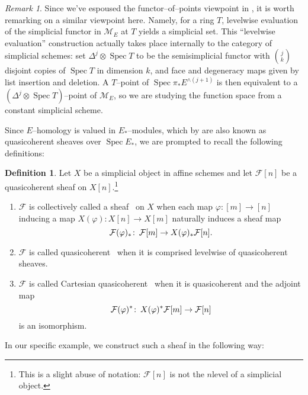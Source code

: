 \documentclass{amsart}
\newcommand{\<}{\langle}
\renewcommand{\>}{\rangle}
\newcommand{\sm}{\wedge}
\renewcommand{\phi}{\varphi}
\newcommand{\co}{\colon\thinspace}
\newcommand{\sheaf}[1]{\mathcal{#1}}
\DeclareMathOperator{\Spec}{Spec}
\theoremstyle{plain}
\theoremstyle{definition}
\newtheorem*{definition}{Definition}
\theoremstyle{remark}
\newtheorem*{remark}{Remark}
\begin{document}
\begin{remark}
Since we've espoused the functor--of--points viewpoint in , it is worth remarking on a similar viewpoint here.  Namely, for a ring $T$, levelwise evaluation of the simplicial functor in $\mathcal{M}_E$ at $T$ yields a simplicial set.  This ``levelwise evaluation'' construction actually takes place internally to the category of simplicial schemes: set $\Delta^j \otimes \Spec T$ to be the semisimplicial functor with $\binom{j}{k}$ disjoint copies of $\Spec T$ in dimension $k$, and face and degeneracy maps given by list insertion and deletion.  A $T$--point of $\Spec \pi_* E^{\sm (j+1)}$ is then equivalent to a $(\Delta^j \otimes \Spec T)$--point of $\mathcal{M}_E$, so we are studying the function space from a constant simplicial scheme.
\end{remark}

Since $E$--homology is valued in $E_*$--modules, which by  are also known as quasicoherent sheaves over $\Spec E_*$, we are prompted to recall the following definitions:
\begin{definition}
Let $X$ be a simplicial object in affine schemes and let $\sheaf F[n]$ be a quasicoherent sheaf on $X[n]$.\footnote{This is a slight abuse of notation: $\sheaf F[n]$ is not the $n$\th level of a simplicial object.}
\begin{enumerate}
\item $\sheaf F$ is collectively called a sheaf~\cite[Tag 09VK]{stacks-project} on $X$ when each map $\phi: [m] \to [n]$ inducing a map $X(\phi): X[n] \to X[m]$ naturally induces a sheaf map \[\sheaf F(\phi)_* \co \sheaf F[m] \to X(\phi)_* \sheaf F[n].\]
\item $\sheaf F$ is called quasicoherent~\cite[Tag 07TF]{stacks-project} when it is comprised levelwise of quasicoherent sheaves.
\item $\sheaf F$ is called Cartesian quasicoherent~\cite[Tag 07TF]{stacks-project} when it is quasicoherent and the adjoint map \[\sheaf F(\phi)^* \co X(\phi)^* \sheaf F[m] \to \sheaf F[n]\] is an isomorphism.
\end{enumerate}
\end{definition}

In our specific example, we construct such a sheaf in the following way:
\end{document}
